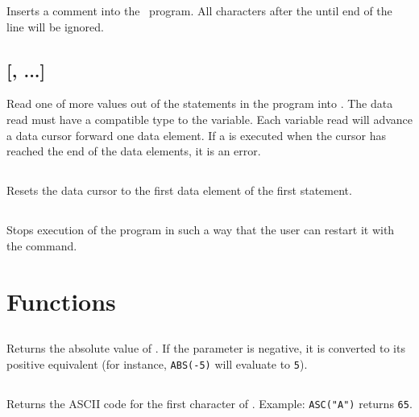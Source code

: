 \documentclass{article}
\begin{document}
    Inserts a comment into the \BASIC\ program. All characters after the  until
    end of the line will be ignored.

    \subsection{ [, ...]}

    Read one of more values out of the  statements in the program into
    .
    The data read must have a compatible type to the variable.
    Each variable read will advance a data cursor forward one data element.
    If a  is executed when the cursor has reached the end of the data
    elements, it is an error.

    \subsection{}

    Resets the data cursor to the first data element of the first  statement.

    \subsection{}

    Stops execution of the program in such a way that the user can restart it with the
     command.

    \section{Functions}

    \subsection{}

    Returns the absolute value of .
    If the parameter is negative, it is converted to its positive equivalent
    (for instance, \verb+ABS(-5)+ will evaluate to \verb+5+).

    \subsection{}

    Returns the ASCII code for the first character of .
    Example: \verb+ASC("A")+ returns \verb+65+.
\end{document}
